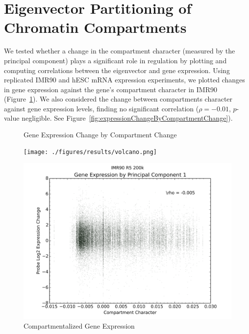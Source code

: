 \section*{Eigenvector Partitioning of Chromatin Compartments}

We tested whether a change in the compartment character (measured by the principal component) plays a significant role in regulation
by plotting and computing correlations between the eigenvector and gene expression.  Using replicated IMR90 and hESC \gls{mRNA} expression
experiments, we plotted changes in gene expression against the gene's compartment character in IMR90 (Figure~\ref{fig:expressionChangeByCompartment}).
We also considered the change between compartments character against gene expression levels, finding no significant correlation ($\rho = -0.01$,
$p$-value negligible. See Figure~\ref{fig:expressionChangeByCompartmentChange}).

\begin{figure}[thp]
  \begin{minipage}{0.45\textwidth}%
    \centering
    \caption{Gene Expression Change by Compartment Change}\label{fig:expressionChangeByCompartmentChange}
    \texttt{[image: ./figures/results/volcano.png]}
  \end{minipage}

  \begin{minipage}{0.45\textwidth}
    \centering
    \caption{Compartmentalized Gene Expression}\label{fig:expressionChangeByCompartment}
    \includegraphics[width=\textwidth]{./figures/results/compartment_ir5_200k.png}
  \end{minipage}
\end{figure}

